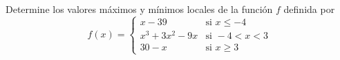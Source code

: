 \item Determine los valores máximos y mínimos locales de la función $f$ definida por
    $$f(x) = \begin{cases} 
    x - 39 & \text{si } x \le -4 \\ 
    x^3 + 3x^2 - 9x & \text{si } -4 < x < 3 \\ 
    30 - x & \text{si } x \ge 3 
    \end{cases}$$
